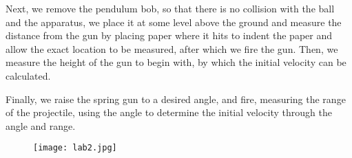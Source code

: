 \documentclass[11pt, titlepage]{article}
\begin{document}
Next, we remove the pendulum bob, so that there is no collision with the ball and the apparatus, we place it at some level above the ground and measure the distance from the gun by placing paper where it hits to indent the paper and allow the exact location to be measured, after which we fire the gun. Then, we measure the height of the gun to begin with, by which the initial velocity can be calculated.

Finally, we raise the spring gun to a desired angle, and fire, measuring the range of the projectile, using the angle to determine the initial velocity through the angle and range. 

\begin{figure}[p]
\centering
\hspace*{-10.5cm}
\texttt{[image: lab2.jpg]}
\vspace*{19cm}
\end{figure}
\end{document}
